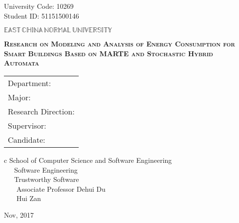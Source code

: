 \newpage

\pagestyle{empty}

\hskip 1.83cm {\large University Code: 10269}\\
\hspace*{\fill} {\large Student ID: 51151500146 }

\vskip 2cm

\begin{center}
{\Huge $\mathbb{EAST}\,\mathbb{CHINA}\,\mathbb{NORMAL}\,
\mathbb{UNIVERSITY}$}
\end{center}

\vskip 3cm

\begin{center}
\bfseries{\scshape{\huge Research on Modeling and Analysis of Energy Consumption for Smart Buildings Based on MARTE and Stochastic Hybrid Automata}}\\
\end{center}

\vskip 2cm {\large
\begin{center}
\begin{tabular}{l}
Department:\\
Major:\\ 
Research Direction:\\
Supervisor:\\
Candidate:
\end{tabular}
\begin{tabular}c
\normalsize{School of Computer Science and Software Engineering}\\
\hline ~~~Software Engineering    \\
\hline ~~~Trustworthy Software\\
\hline ~~~ Associate Professor Dehui Du\\
\hline ~~~  Hui Zan\\
\hline
\end{tabular}
\end{center}}

\vskip 30mm

\begin{center}
{\Large Nov, 2017}
\end{center}
